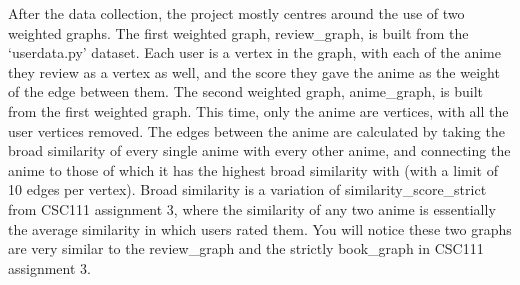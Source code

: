 \documentclass[fontsize=11pt]{article}
\begin{document}
\item[]After the data collection, the project mostly centres around the use of two weighted graphs. The first weighted graph, review\_graph, is built from the ‘userdata.py’ dataset. Each user is a vertex in the graph, with each of the anime they review as a vertex as well, and the score they gave the anime as the weight of the edge between them. The second weighted graph, anime\_graph, is built from the first weighted graph. This time, only the anime are vertices, with all the user vertices removed. The edges between the anime are calculated by taking the broad similarity of every single anime with every other anime, and connecting the anime to those of which it has the highest broad similarity with (with a limit of 10 edges per vertex). Broad similarity is a variation of similarity\_score\_strict from CSC111 assignment 3, where the similarity of any two anime is essentially the average similarity in which users rated them. You will notice these two graphs are very similar to the review\_graph and the strictly book\_graph in CSC111 assignment 3. 
\end{document}
